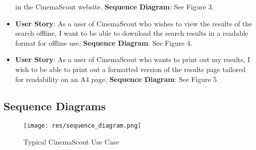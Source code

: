 \documentclass{article}
\begin{document}
\begin{itemize}
in the CinemaScout website.
\newline\textbf{Sequence Diagram}: See Figure 3.
\item \textbf{User Story}: As a user of CinemaScout who wishes to view
the results of the search offline, I want to be able to download the search
results in a readable format for offline use.
\newline\textbf{Sequence Diagram}: See Figure 4.
\item \textbf{User Story}: As a user of CinemaScout who wants to print out my
results, I wish to be able to print out a formatted version of the results page
tailored for readability on an A4 page.
\newline\textbf{Sequence Diagram}: See Figure 5.
\end{itemize}
\subsection{Sequence Diagrams}
\begin{figure}[H]
\texttt{[image: res/sequence\_diagram.png]}
\caption{Typical CinemaScout Use Case}
\end{figure}
\end{document}
